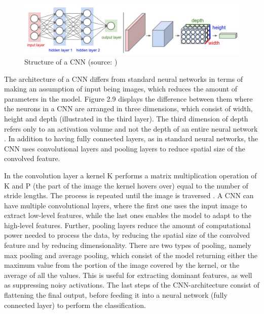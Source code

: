 \indent\newline 
\begin{figure}[H]
\centering
\includegraphics [scale=0.34,angle=360]{figures/cnn.png}
\caption{Structure of a CNN (source: \cite{zakka})}
\label{fig:cnn}
\end{figure}

\indent\newline 
The architecture of a CNN differs from standard neural networks in terms of making an assumption of input being images, which reduces the amount of parameters in the model. Figure 2.9 displays the difference between them where the neurons in a CNN are arranged in three dimensions, which consist of width, height and depth (illustrated in the third layer). The third dimension of depth refers only to an activation volume and not the depth of an entire neural network \cite{zakka}. In addition to having fully connected layers, as in standard neural networks, the CNN uses convolutional layers and pooling layers to reduce spatial size of the convolved feature. 

\indent\newline 
In the convolution layer a kernel K performs a matrix multiplication operation of K and P (the part of the image the kernel hovers over) equal to the number of stride lengths. The process is repeated until the image is traversed \cite{saha}. A CNN can have multiple convolutional layers, where the first one uses the input image to extract low-level features, while the last ones enables the model to adapt to the high-level features. Further, pooling layers reduce the amount of computational power needed to process the data, by reducing the spatial size of the convolved feature and by reducing dimensionality. There are two types of pooling, namely max pooling and average pooling, which consist of the model returning either the maximum value from the portion of the image covered by the kernel, or the average of all the values\cite{saha}. This is useful for extracting dominant features, as well as suppressing noisy activations. The last steps of the CNN-architecture consist of flattening the final output, before feeding it into a neural network (fully connected layer) to perform the classification.   

